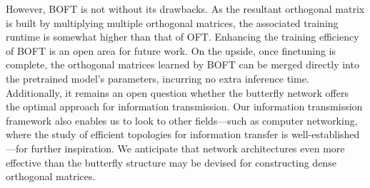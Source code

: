 However, BOFT is not without its drawbacks. As the resultant orthogonal matrix is built by multiplying multiple orthogonal matrices, the associated training runtime is somewhat higher than that of OFT. Enhancing the training efficiency of BOFT is an open area for future work. On the upside, once finetuning is complete, the orthogonal matrices learned by BOFT can be merged directly into the pretrained model’s parameters, incurring no extra inference time. Additionally, it remains an open question whether the butterfly network offers the optimal approach for information transmission. Our information transmission framework also enables us to look to other fields—such as computer networking, where the study of efficient topologies for information transfer is well-established—for further inspiration. We anticipate that network architectures even more effective than the butterfly structure may be devised for constructing dense orthogonal matrices.

